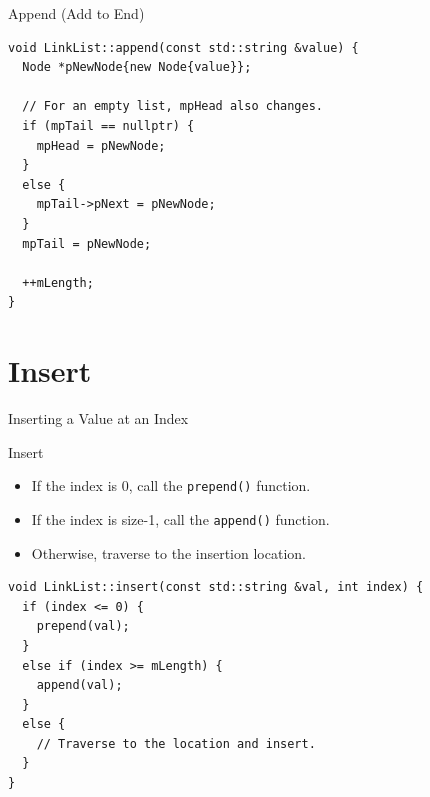 \documentclass[14pt,aspectratio=1610, hyperref={pdfpagelayout=SinglePage}]{beamer}
\begin{document}
\begin{frame}[fragile]{Append (Add to End)}
\begin{lstlisting}[basicstyle=\small\ttfamily]
void LinkList::append(const std::string &value) {
  Node *pNewNode{new Node{value}};

  // For an empty list, mpHead also changes.
  if (mpTail == nullptr) {
    mpHead = pNewNode;
  }
  else {
    mpTail->pNext = pNewNode;
  }
  mpTail = pNewNode;

  ++mLength;
}
\end{lstlisting}
\end{frame}

\section{Insert}

\begin{frame}{}
\centering
{\Large Inserting a Value at an Index}
\\[3em]
\end{frame}

\begin{frame}[fragile]{Insert}
\begin{itemize}
\item
  If the index is 0, call the \lstinline{prepend()} function.
\item
  If the index is size-1, call the \lstinline{append()} function.
\item
  Otherwise, traverse to the insertion location.
\end{itemize}
\begin{lstlisting}[basicstyle=\small\ttfamily]
void LinkList::insert(const std::string &val, int index) {
  if (index <= 0) {
    prepend(val);
  }
  else if (index >= mLength) {
    append(val);
  }
  else {
    // Traverse to the location and insert.
  }
}
\end{lstlisting}
\end{frame}
\end{document}
